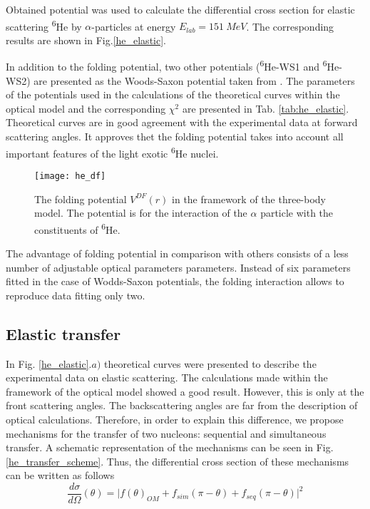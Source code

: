 \documentclass[
12pt, %
oneside, %
english, %
onehalfspacing, %
onehalfspacing, %
headsepline, %
]{MastersDoctoralThesis} %
\newcommand{\he}{\textsuperscript{6}He\xspace}
\begin{document}
Obtained potential was used to calculate the differential cross section for elastic scattering \he by $\alpha$-particles at energy $ E_{lab} = 151~MeV$. 
The corresponding results are shown in Fig.\ref{he_elastic}. 

In addition to the folding potential, two other potentials (\he-WS1 and \he-WS2) are presented as the Woods-Saxon potential taken from \cite{oganessian1999dynamics}.
 The parameters of the potentials used in the calculations of the theoretical curves within the optical model and the corresponding $ \chi^2 $ are presented in Tab. \ref{tab:he_elastic}.
Theoretical curves are in good agreement with the experimental data at forward scattering angles.
It approves thet the folding potential takes into account all important features of the light exotic \he nuclei.

\begin{figure}[tp]
\centering
\texttt{[image: he\_df]}
\decoRule
\caption{  \footnotesize  The folding potential $V^{DF}(r)$ in the framework of the three-body model. The potential is for the interaction of the $\alpha$ particle with the constituents of \he.
}
\label{he_df}
\end{figure}

The advantage of folding potential in comparison with others consists of a less number of adjustable optical parameters parameters. Instead of six parameters fitted in the case of Wodds-Saxon potentials, the folding interaction allows to reproduce data fitting only two.



\subsection{Elastic transfer}
In Fig. \ref{he_elastic}.$a)$ theoretical curves were presented to describe the experimental data on elastic scattering. The calculations made within the framework of the optical model showed a good result. However, this is only at the front scattering angles. The backscattering angles are far from the description of optical calculations. Therefore, in order to explain this difference, we propose mechanisms for the transfer of two nucleons: sequential and simultaneous transfer. A schematic representation of the mechanisms can be seen in Fig. \ref{he_transfer_scheme}.  Thus, the differential cross section of these mechanisms can be written as follows
\begin{equation}
\dfrac{d\sigma}{d\Omega}(\theta) =
 \vert f(\theta)_{OM} + f_{sim}(\pi - \theta)+ f_{seq}(\pi - \theta)  \vert^2
\label{eq:he_cs}
\end{equation}
\end{document}
